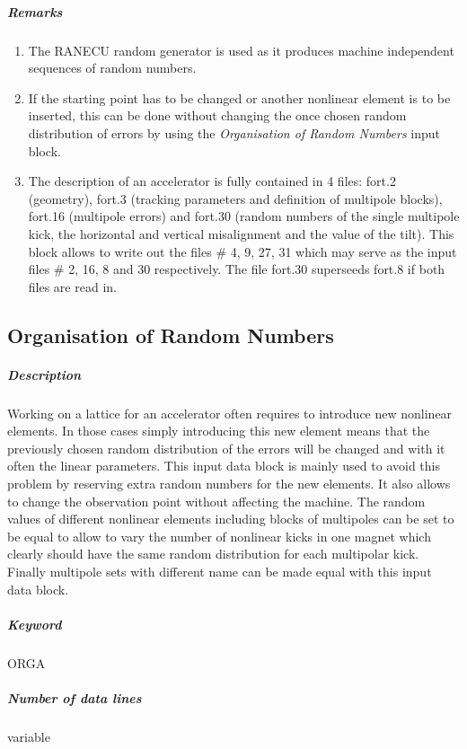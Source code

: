 \documentclass[a4paper,11pt]{report}
\begin{document}
\subparagraph{Remarks}
\begin{enumerate}
\item The RANECU random generator \cite{RANECU} is used as it produces
  machine independent sequences of random numbers.
\item If the starting point has to be changed or another nonlinear
  element is to be inserted, this can be done without changing the
  once chosen random distribution of errors by using the {\em
    Organisation of Random Numbers} \/input block.
\item The description of an accelerator is fully contained in 4 files:
  fort.2 (geometry), fort.3 (tracking parameters and definition of
  multipole blocks), fort.16 (multipole errors) and fort.30 (random
  numbers of the single multipole kick, the horizontal and vertical
  misalignment and the value of the tilt). This block allows to write
  out the files \# 4, 9, 27, 31 which may serve as the input files \#
  2, 16, 8 and 30 respectively. The file fort.30 superseeds fort.8 if
  both files are read in.
\end{enumerate}

\subsection{Organisation of Random Numbers} \label{OrgRan}

\subparagraph{Description} Working on a lattice for an accelerator
often requires to introduce new nonlinear elements. In those cases
simply introducing this new element means that the previously chosen
random distribution of the errors will be changed and with it often
the linear parameters. This input data block is mainly used to avoid
this problem by reserving extra random numbers for the new elements.
It also allows to change the observation point without affecting the
machine. The random values of different nonlinear elements including
blocks of multipoles can be set to be equal to allow to vary the
number of nonlinear kicks in one magnet which clearly should have the
same random distribution for each multipolar kick. Finally multipole
sets with different name can be made equal with this input data block.

\subparagraph{Keyword} ORGA \subparagraph{Number of data lines}
variable
\end{document}
